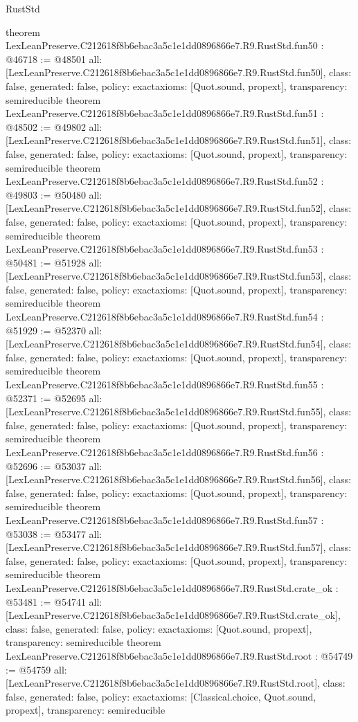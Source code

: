 \begin{lexlean}{RustStd}
\begin{coremodule}
{}
theorem LexLeanPreserve.C212618f8b6ebac3a5c1e1dd0896866e7.R9.RustStd.fun50 : @46718 := @48501 {
  all: [LexLeanPreserve.C212618f8b6ebac3a5c1e1dd0896866e7.R9.RustStd.fun50],
  class: false,
  generated: false,
  policy: exact{axioms: [Quot.sound, propext]},
  transparency: semireducible
}
theorem LexLeanPreserve.C212618f8b6ebac3a5c1e1dd0896866e7.R9.RustStd.fun51 : @48502 := @49802 {
  all: [LexLeanPreserve.C212618f8b6ebac3a5c1e1dd0896866e7.R9.RustStd.fun51],
  class: false,
  generated: false,
  policy: exact{axioms: [Quot.sound, propext]},
  transparency: semireducible
}
theorem LexLeanPreserve.C212618f8b6ebac3a5c1e1dd0896866e7.R9.RustStd.fun52 : @49803 := @50480 {
  all: [LexLeanPreserve.C212618f8b6ebac3a5c1e1dd0896866e7.R9.RustStd.fun52],
  class: false,
  generated: false,
  policy: exact{axioms: [Quot.sound, propext]},
  transparency: semireducible
}
theorem LexLeanPreserve.C212618f8b6ebac3a5c1e1dd0896866e7.R9.RustStd.fun53 : @50481 := @51928 {
  all: [LexLeanPreserve.C212618f8b6ebac3a5c1e1dd0896866e7.R9.RustStd.fun53],
  class: false,
  generated: false,
  policy: exact{axioms: [Quot.sound, propext]},
  transparency: semireducible
}
theorem LexLeanPreserve.C212618f8b6ebac3a5c1e1dd0896866e7.R9.RustStd.fun54 : @51929 := @52370 {
  all: [LexLeanPreserve.C212618f8b6ebac3a5c1e1dd0896866e7.R9.RustStd.fun54],
  class: false,
  generated: false,
  policy: exact{axioms: [Quot.sound, propext]},
  transparency: semireducible
}
theorem LexLeanPreserve.C212618f8b6ebac3a5c1e1dd0896866e7.R9.RustStd.fun55 : @52371 := @52695 {
  all: [LexLeanPreserve.C212618f8b6ebac3a5c1e1dd0896866e7.R9.RustStd.fun55],
  class: false,
  generated: false,
  policy: exact{axioms: [Quot.sound, propext]},
  transparency: semireducible
}
theorem LexLeanPreserve.C212618f8b6ebac3a5c1e1dd0896866e7.R9.RustStd.fun56 : @52696 := @53037 {
  all: [LexLeanPreserve.C212618f8b6ebac3a5c1e1dd0896866e7.R9.RustStd.fun56],
  class: false,
  generated: false,
  policy: exact{axioms: [Quot.sound, propext]},
  transparency: semireducible
}
theorem LexLeanPreserve.C212618f8b6ebac3a5c1e1dd0896866e7.R9.RustStd.fun57 : @53038 := @53477 {
  all: [LexLeanPreserve.C212618f8b6ebac3a5c1e1dd0896866e7.R9.RustStd.fun57],
  class: false,
  generated: false,
  policy: exact{axioms: [Quot.sound, propext]},
  transparency: semireducible
}
theorem LexLeanPreserve.C212618f8b6ebac3a5c1e1dd0896866e7.R9.RustStd.crate_ok : @53481 := @54741 {
  all: [LexLeanPreserve.C212618f8b6ebac3a5c1e1dd0896866e7.R9.RustStd.crate_ok],
  class: false,
  generated: false,
  policy: exact{axioms: [Quot.sound, propext]},
  transparency: semireducible
}
theorem LexLeanPreserve.C212618f8b6ebac3a5c1e1dd0896866e7.R9.RustStd.root : @54749 := @54759 {
  all: [LexLeanPreserve.C212618f8b6ebac3a5c1e1dd0896866e7.R9.RustStd.root],
  class: false,
  generated: false,
  policy: exact{axioms: [Classical.choice, Quot.sound, propext]},
  transparency: semireducible
}


\end{coremodule}
\end{lexlean}
